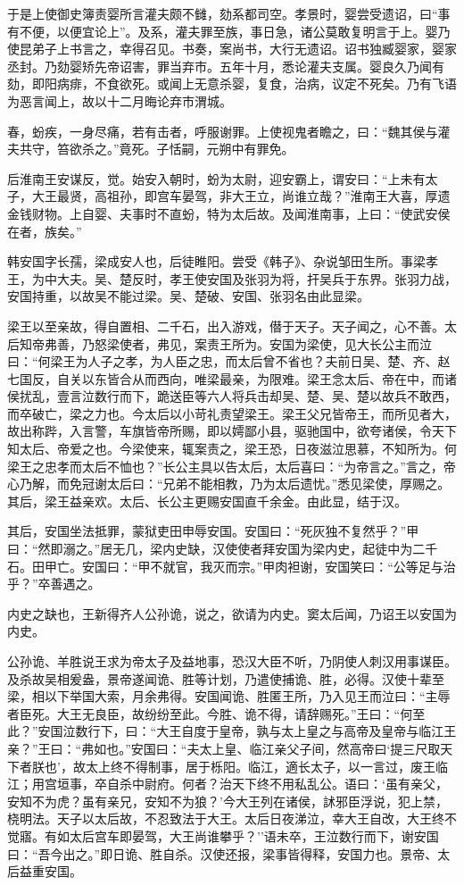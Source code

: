 \documentclass[]{article}
\begin{document}
于是上使御史簿责婴所言灌夫颇不雠，劾系都司空。孝景时，婴尝受遗诏，曰``事有不便，以便宜论上''。及系，灌夫罪至族，事日急，诸公莫敢复明言于上。婴乃使昆弟子上书言之，幸得召见。书奏，案尚书，大行无遗诏。诏书独臧婴家，婴家丞封。乃劾婴矫先帝诏害，罪当弃市。五年十月，悉论灌夫支属。婴良久乃闻有劾，即阳病痱，不食欲死。或闻上无意杀婴，复食，治病，议定不死矣。乃有飞语为恶言闻上，故以十二月晦论弃市渭城。

春，蚡疾，一身尽痛，若有击者，呼服谢罪。上使视鬼者瞻之，曰：``魏其侯与灌夫共守，笞欲杀之。''竟死。子恬嗣，元朔中有罪免。

后淮南王安谋反，觉。始安入朝时，蚡为太尉，迎安霸上，谓安曰：``上未有太子，大王最贤，高祖孙，即宫车晏驾，非大王立，尚谁立哉？''淮南王大喜，厚遗金钱财物。上自婴、夫事时不直蚡，特为太后故。及闻淮南事，上曰：``使武安侯在者，族矣。''

韩安国字长孺，梁成安人也，后徒睢阳。尝受《韩子》、杂说邹田生所。事梁孝王，为中大夫。吴、楚反时，孝王使安国及张羽为将，扞吴兵于东界。张羽力战，安国持重，以故吴不能过梁。吴、楚破、安国、张羽名由此显梁。

梁王以至亲故，得自置相、二千石，出入游戏，僣于天子。天子闻之，心不善。太后知帝弗善，乃怒梁使者，弗见，案责王所为。安国为梁使，见大长公主而泣曰：``何梁王为人子之孝，为人臣之忠，而太后曾不省也？夫前日吴、楚、齐、赵七国反，自关以东皆合从而西向，唯梁最亲，为限难。梁王念太后、帝在中，而诸侯扰乱，壹言泣数行而下，跪送臣等六人将兵击却吴、楚、吴、楚以故兵不敢西，而卒破亡，梁之力也。今太后以小苛礼责望梁王。梁王父兄皆帝王，而所见者大，故出称跸，入言警，车旗皆帝所赐，即以嫮鄙小县，驱驰国中，欲夸诸侯，令天下知太后、帝爱之也。今梁使来，辄案责之，梁王恐，日夜滋泣思慕，不知所为。何梁王之忠孝而太后不恤也？''长公主具以告太后，太后喜曰：``为帝言之。''言之，帝心乃解，而免冠谢太后曰：``兄弟不能相教，乃为太后遗忧。''悉见梁使，厚赐之。其后，梁王益亲欢。太后、长公主更赐安国直千余金。由此显，结于汉。

其后，安国坐法抵罪，蒙狱吏田申辱安国。安国曰：``死灰独不复然乎？''甲曰：``然即溺之。''居无几，梁内史缺，汉使使者拜安国为梁内史，起徒中为二千石。田甲亡。安国曰：``甲不就官，我灭而宗。''甲肉袒谢，安国笑曰：``公等足与治乎？''卒善遇之。

内史之缺也，王新得齐人公孙诡，说之，欲请为内史。窦太后闻，乃诏王以安国为内史。

公孙诡、羊胜说王求为帝太子及益地事，恐汉大臣不听，乃阴使人刺汉用事谋臣。及杀故吴相爰盎，景帝遂闻诡、胜等计划，乃遣使捕诡、胜，必得。汉使十辈至梁，相以下举国大索，月余弗得。安国闻诡、胜匿王所，乃入见王而泣曰：``主辱者臣死。大王无良臣，故纷纷至此。今胜、诡不得，请辞赐死。''王曰：``何至此？''安国泣数行下，曰：``大王自度于皇帝，孰与太上皇之与高帝及皇帝与临江王亲？''王曰：``弗如也。''安国曰：``夫太上皇、临江亲父子间，然高帝曰`提三尺取天下者朕也'，故太上终不得制事，居于栎阳。临江，適长太子，以一言过，废王临江；用宫垣事，卒自杀中尉府。何者？治天下终不用私乱公。语曰：`虽有亲父，安知不为虎？虽有亲兄，安知不为狼？'今大王列在诸侯，訹邪臣浮说，犯上禁，桡明法。天子以太后故，不忍致法于大王。太后日夜涕泣，幸大王自改，大王终不觉寤。有如太后宫车即晏驾，大王尚谁攀乎？''语未卒，王泣数行而下，谢安国曰：``吾今出之。''即日诡、胜自杀。汉使还报，梁事皆得释，安国力也。景帝、太后益重安国。
\end{document}

